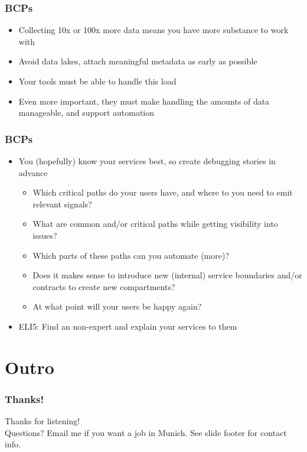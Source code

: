 \documentclass[aspectratio=169]{beamer}
\begin{document}
\begin{frame}
	\frametitle{BCPs}
	\begin{itemize}
		\item Collecting 10x or 100x more data means you have more substance to work with
		\item Avoid data lakes, attach meaningful metadata as early as possible
		\item Your tools must be able to handle this load
		\item Even more important, they must make handling the amounts of data manageable, and support automation
	\end{itemize}
\end{frame}

\begin{frame}
	\frametitle{BCPs}
	\begin{itemize}
		\item You (hopefully) know your services best, so create debugging stories in advance
		\begin{itemize}
			\item Which critical paths do your users have, and where to you need to emit relevant signals?
			\item What are common and/or critical paths while getting visibility into issues?
			\item Which parts of these paths can you automate (more)?
			\item Does it makes sense to introduce new (internal) service boundaries and/or contracts to create new compartments?
			\item At what point will your users be happy again?
		\end{itemize}
		\item ELI5: Find an non-expert and explain your services to them
	\end{itemize}
\end{frame}


\section{Outro}

\begin{frame}
	\frametitle{Thanks!}
	\begin{center}
		\vfill
		Thanks for listening!\\
		\vfill
		Questions?
		\vfill
		Email me if you want a job in Munich.
		\vfill
		See slide footer for contact info.
		\vfill
	\end{center}
\end{frame}
\end{document}
